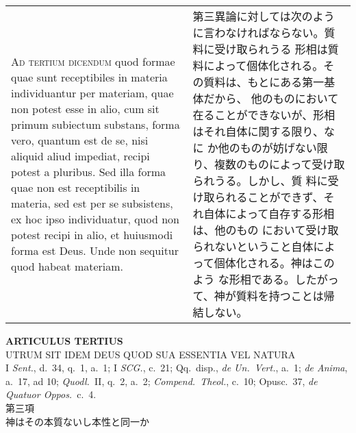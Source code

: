 \documentclass[10pt]{jsarticle}
\begin{document}
\begin{longtable}{p{21em}p{21em}}
\\


\textsc{Ad tertium dicendum} quod formae quae sunt receptibiles in
materia individuantur per materiam, quae non potest esse in alio, cum
sit primum subiectum substans, forma vero, quantum est de se, nisi
aliquid aliud impediat, recipi potest a pluribus. Sed illa forma quae
non est receptibilis in materia, sed est per se subsistens, ex hoc
ipso individuatur, quod non potest recipi in alio, et huiusmodi forma
est Deus. Unde non sequitur quod habeat materiam.

&

第三異論に対しては次のように言わなければならない。質料に受け取られうる
形相は質料によって個体化される。その質料は、もとにある第一基体だから、
他のものにおいて在ることができないが、形相はそれ自体に関する限り、なに
か他のものが妨げない限り、複数のものによって受け取られうる。しかし、質
料に受け取られることができず、それ自体によって自存する形相は、他のもの
において受け取られないということ自体によって個体化される。神はこのよう
な形相である。したがって、神が質料を持つことは帰結しない。



\end{longtable}


\newpage
{}

\begin{center}
 {\Large {\bf ARTICULUS TERTIUS}}\\
 {\large UTRUM SIT IDEM DEUS QUOD SUA ESSENTIA VEL NATURA}\\
 {\footnotesize I \textit{Sent.}, d.~34, q.~1, a.~1; I \textit{SCG.},
 c.~21; Qq.~disp., \textit{de Un.~Vert.}, a.~1; \textit{de Anima},
 a.~17, ad 10; \textit{Quodl.}~II, q.~2, a.~2; \textit{Compend.~Theol.},
 c.~10; Opusc.~37, \textit{de Quatuor Oppos.}~c.~4.}\\
{\Large 第三項\\神はその本質ないし本性と同一か}

\end{center}
\end{document}

